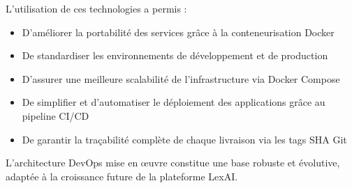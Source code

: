 L’utilisation de ces technologies a permis :

\begin{itemize}[label=--]
    \item D’améliorer la portabilité des services grâce à la conteneurisation Docker
    \item De standardiser les environnements de développement et de production
    \item D’assurer une meilleure scalabilité de l’infrastructure via Docker Compose
    \item De simplifier et d’automatiser le déploiement des applications grâce au pipeline CI/CD
    \item De garantir la traçabilité complète de chaque livraison via les tags SHA Git
\end{itemize}

L’architecture DevOps mise en œuvre constitue une base robuste et évolutive, adaptée à la croissance future de la plateforme LexAI.